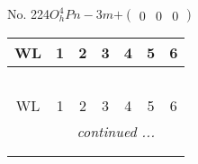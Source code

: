 \documentclass[fleqn,9pt,landscape]{jsarticle}
\begin{document}
\newpage
No. 224\quad$O_{h}^{4}$\quad$Pn-3m$\quad[ cubic ]\quad$+\begin{pmatrix} 0 & 0 & 0 \end{pmatrix}$
\begin{center}
\renewcommand{\arraystretch}{1.2}
\begin{longtable}{ccccccc}
 \hline \hline
WL & 1 & 2 & 3 & 4 & 5 & 6 \\ \hline \endfirsthead

\multicolumn{6}{l}{\tablename\ \thetable{}} \\
 \hline \hline
WL & 1 & 2 & 3 & 4 & 5 & 6 \\ \hline \endhead

 \hline \hline
\multicolumn{6}{r}{\footnotesize\it continued ...} \\ \endfoot

 \hline \hline
\multicolumn{6}{r}{} \\ \endlastfoot


\end{longtable}
\end{center}
\end{document}
